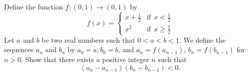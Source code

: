 \begin{problem}
    Define the function $f:(0,1)\to (0,1)$ by\[\displaystyle f(x) = \left\{ \begin{array}{lr} x+\frac 12 & \text{if}\ \  x < \frac 12\\ x^2 & \text{if}\ \  x \ge \frac 12 \end{array} \right.\]Let $a$ and $b$ be two real numbers such that $0 < a < b < 1$. We define the sequences $a_n$ and $b_n$ by $a_0 = a, b_0 = b$, and $a_n = f( a_{n -1})$, $b_n = f (b_{n -1} )$ for $n > 0$. Show that there exists a positive integer $n$ such that\[(a_n - a_{n-1})(b_n-b_{n-1})<0.\]
    \label{14ISLA2}
\end{problem}